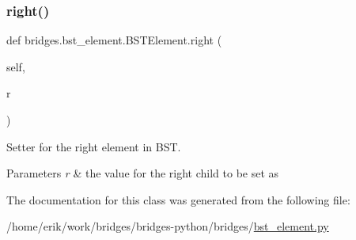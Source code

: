 \subsubsection{\texorpdfstring{right()}{right()}\hspace{0.1cm}{\footnotesize\ttfamily [2/2]}}
{\footnotesize\ttfamily def bridges.\+bst\+\_\+element.\+B\+S\+T\+Element.\+right (\begin{DoxyParamCaption}\item[{}]{self,  }\item[{}]{r }\end{DoxyParamCaption})}



Setter for the right element in B\+ST. 


\begin{DoxyParams}{Parameters}
{\em r} & the value for the right child to be set as \\
\hline
\end{DoxyParams}


The documentation for this class was generated from the following file\+:\begin{DoxyCompactItemize}
\item 
/home/erik/work/bridges/bridges-\/python/bridges/\hyperlink{bst__element_8py}{bst\+\_\+element.\+py}\end{DoxyCompactItemize}

